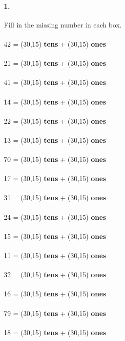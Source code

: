 \documentclass[12pt]{article}
\begin{document}
\paragraph{1.}
Fill in the missing number in each box. \\
\\
42 = \framebox(30,15){} \textbf{tens} + \framebox(30,15){} \textbf{ones}
\\
\\
21 = \framebox(30,15){} \textbf{tens} + \framebox(30,15){} \textbf{ones}
\\
\\
41 = \framebox(30,15){} \textbf{tens} + \framebox(30,15){} \textbf{ones}
\\
\\
14 = \framebox(30,15){} \textbf{tens} + \framebox(30,15){} \textbf{ones}
\\
\\
22 = \framebox(30,15){} \textbf{tens} + \framebox(30,15){} \textbf{ones}
\\
\\
13 = \framebox(30,15){} \textbf{tens} + \framebox(30,15){} \textbf{ones}
\\
\\
70 = \framebox(30,15){} \textbf{tens} + \framebox(30,15){} \textbf{ones}
\\
\\
17 = \framebox(30,15){} \textbf{tens} + \framebox(30,15){} \textbf{ones}
\\
\\
31 = \framebox(30,15){} \textbf{tens} + \framebox(30,15){} \textbf{ones}
\\
\\
24 = \framebox(30,15){} \textbf{tens} + \framebox(30,15){} \textbf{ones}
\\
\\
15 = \framebox(30,15){} \textbf{tens} + \framebox(30,15){} \textbf{ones}
\\
\\
11 = \framebox(30,15){} \textbf{tens} + \framebox(30,15){} \textbf{ones}
\\
\\
32 = \framebox(30,15){} \textbf{tens} + \framebox(30,15){} \textbf{ones}
\\
\\
16 = \framebox(30,15){} \textbf{tens} + \framebox(30,15){} \textbf{ones}
\\
\\
79 = \framebox(30,15){} \textbf{tens} + \framebox(30,15){} \textbf{ones}
\\
\\
18 = \framebox(30,15){} \textbf{tens} + \framebox(30,15){} \textbf{ones}
\end{document}
